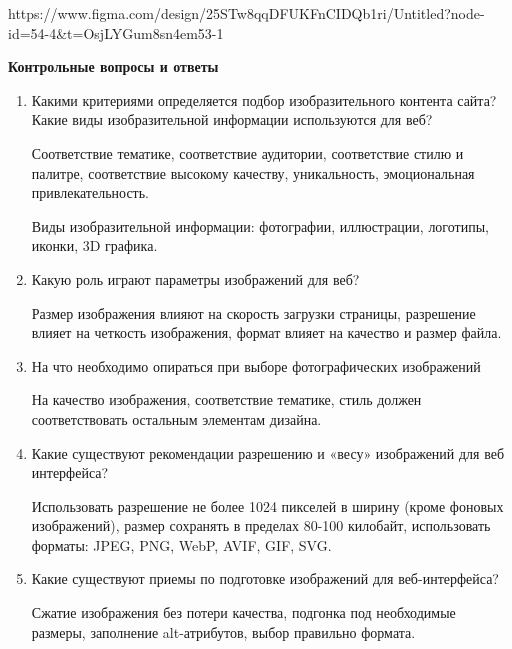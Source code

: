 \noindent
\begin{minipage}{\linewidth}
\end{minipage}
\bigskip

https://www.figma.com/design/25STw8qqDFUKFnCIDQb1ri/Untitled?node-id=54-4&t=OsjLYGum8sn4em53-1

\textbf{Контрольные вопросы и ответы}

\begin{enumerate}
    \item Какими критериями определяется подбор изобразительного контента сайта?Какие виды изобразительной информации используются для веб?

        Соответствие тематике, соответствие аудитории, соответствие стилю и палитре, соответствие высокому качеству, уникальность, эмоциональная привлекательность.
        \bigskip

        Виды изобразительной информации:
        фотографии, иллюстрации, логотипы, иконки, 3D графика.
    \item Какую роль играют параметры изображений для веб?

        Размер изображения влияют на скорость загрузки страницы, разрешение влияет на четкость изображения, формат влияет на качество и размер файла.
    \item На что необходимо опираться при выборе фотографических изображений

        На качество изображения, соответствие тематике, стиль должен соответствовать остальным элементам дизайна.
    \item Какие существуют рекомендации разрешению и «весу» изображений для веб интерфейса?

        Использовать разрешение не более 1024 пикселей в ширину (кроме фоновых изображений), размер сохранять в пределах 80-100 килобайт, использовать форматы: JPEG, PNG, WebP, AVIF, GIF, SVG.
    \item Какие существуют приемы по подготовке изображений для веб-интерфейса?

        Сжатие изображения без потери качества, подгонка под необходимые размеры, заполнение alt-атрибутов, выбор правильно формата.
\end{enumerate}


